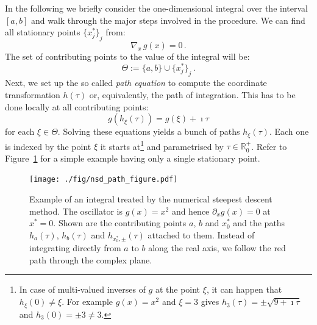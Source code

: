 \documentclass[a4paper,10pt]{article}
\begin{document}
In the following we briefly consider the one-dimensional integral over the interval
$[a,b]$ and walk through the major steps involved in the procedure. We can find all
stationary points ${\{x_{j}^{*}\}}_{j}$ from:
\begin{equation}
  \nabla_{x} \, g(x) = 0 \,.
\end{equation}
The set of contributing points to the value of the integral will be:
\begin{equation}
  \Theta := \{a, b\} \cup {\{x^{*}_j\}}_j \,.
\end{equation}
Next, we set up the so called \emph{path equation} to compute the coordinate
transformation $h(\tau)$ or, equivalently, the path of integration. This has to
be done locally at all contributing points:
\begin{equation}
  g(h_\xi(\tau)) = g(\xi) + \imath \tau
\end{equation}
for each $\xi \in \Theta$.
Solving these equations yields a bunch of paths $h_{\xi}(\tau)$. Each one is
indexed by the point $\xi$ it starts at\footnote{In case of multi-valued inverses
of $g$ at the point $\xi$, it can happen that $h_\xi(0) \neq \xi$. For example $g (x)= x^2$
and $\xi = 3$ gives $h_3(\tau) = \pm \sqrt{9+\imath\tau}$ and $h_3(0) = \pm 3 \neq 3$.}
and parametrised by $\tau \in \mathbb{R}_0^{+}$.
Refer to Figure~\ref{fig:nsd_path_example} for a simple example having only a single
stationary point.

\begin{figure}
  \centering
  \texttt{[image: ./fig/nsd\_path\_figure.pdf]}
  \caption{Example of an integral treated by the numerical steepest descent method.
  The oscillator is $g(x) = x^2$ and hence $\partial_x g(x) = 0$ at $x^{*} = 0$.
  Shown are the contributing points $a$, $b$ and $x_0^{*}$ and the paths
  $h_a(\tau)$, $h_b(\tau)$ and $h_{x_0^{*},\pm}(\tau)$ attached to them.
  Instead of integrating directly from $a$ to $b$ along the real axis, we follow
  the red path through the complex plane.}
  \label{fig:nsd_path_example}
\end{figure}
\end{document}

